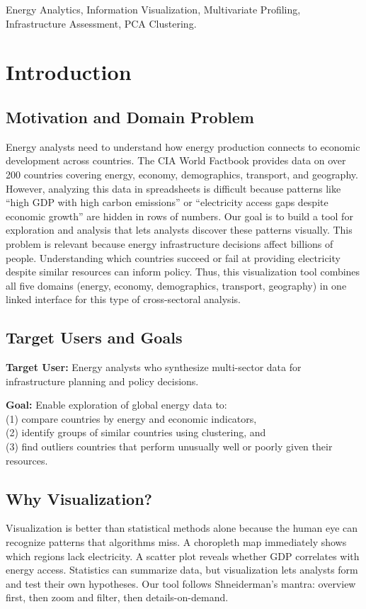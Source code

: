\documentclass[conference]{IEEEtran}
\begin{document}
\begin{IEEEkeywords}
Energy Analytics, Information Visualization, Multivariate Profiling, Infrastructure Assessment, PCA Clustering.
\end{IEEEkeywords}
{\color{blue}
\section{Introduction}
\subsection{Motivation and Domain Problem}
Energy analysts need to understand how energy production connects to economic development across countries. The CIA World Factbook provides data on over 200 countries covering energy, economy, demographics, transport, and geography. However, analyzing this data in spreadsheets is difficult because patterns like ``high GDP with high carbon emissions'' or ``electricity access gaps despite economic growth'' are hidden in rows of numbers. Our goal is to build a tool for exploration and analysis that lets analysts discover these patterns visually. This problem is relevant because energy infrastructure decisions affect billions of people. Understanding which countries succeed or fail at providing electricity despite similar resources can inform policy. Thus, this visualization tool combines all five domains (energy, economy, demographics, transport, geography) in one linked interface for this type of cross-sectoral analysis.

\subsection{Target Users and Goals}
\textbf{Target User:} Energy analysts who synthesize multi-sector data for infrastructure planning and policy decisions.

\textbf{Goal:} Enable exploration of global energy data to: \\(1) compare countries by energy and economic indicators, \\(2) identify groups of similar countries using clustering, and \\(3) find outliers countries that perform unusually well or poorly given their resources.

\subsection{Why Visualization?}
Visualization is better than statistical methods alone because the human eye can recognize patterns that algorithms miss. A choropleth map immediately shows which regions lack electricity. A scatter plot reveals whether GDP correlates with energy access. Statistics can summarize data, but visualization lets analysts form and test their own hypotheses. Our tool follows Shneiderman's mantra: overview first, then zoom and filter, then details-on-demand.
}
\end{document}
